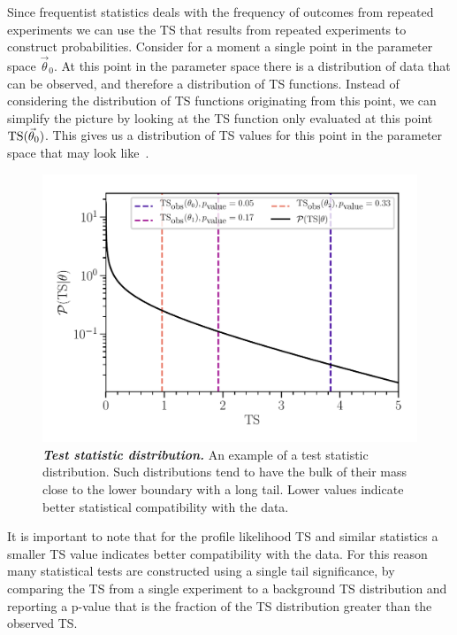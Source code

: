 Since frequentist statistics deals with the frequency of outcomes from repeated experiments we can use the TS that results from repeated experiments to construct probabilities.
Consider for a moment a single point in the parameter space $\vec\theta_0$.
At this point in the parameter space there is a distribution of data that can be observed, and therefore a distribution of TS functions.
Instead of considering the distribution of TS functions originating from this point, we can simplify the picture by looking at the TS function only evaluated at this point $\mathrm{TS}(\vec\theta_0)$.
This gives us a distribution of TS values for this point in the parameter space that may look like~.
\begin{figure}
	\centering
	\includegraphics[width=0.8\linewidth]{figures/TS_dist}
	\caption{\textbf{\textit{Test statistic distribution.}} An example of a test statistic distribution.
	Such distributions tend to have the bulk of their mass close to the lower boundary with a long tail.
	Lower values indicate better statistical compatibility with the data.
	}
	\label{fig:TS_dist}
\end{figure}
It is important to note that for the profile likelihood TS and similar statistics a smaller TS value indicates better compatibility with the data.
For this reason many statistical tests are constructed using a single tail significance, by comparing the TS from a single experiment to a background TS distribution and reporting a p-value that is the fraction of the TS distribution greater than the observed TS.

